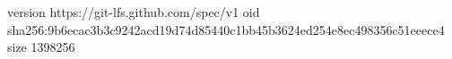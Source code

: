 version https://git-lfs.github.com/spec/v1
oid sha256:9b6ecac3b3c9242acd19d74d85440c1bb45b3624ed254e8ec498356c51eeece4
size 1398256
